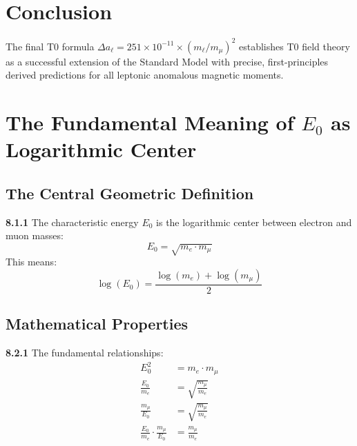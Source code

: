 \documentclass[12pt,a4paper]{article}
\newcommand{\Ezero}{E_0}
\begin{document}
	\section{Conclusion}
	
	The final T0 formula $\Delta a_\ell = 251 \times 10^{-11} \times (m_\ell/m_\mu)^2$ establishes T0 field theory as a successful extension of the Standard Model with precise, first-principles derived predictions for all leptonic anomalous magnetic moments.

\section{The Fundamental Meaning of $\Ezero$ as Logarithmic Center}

\subsection{The Central Geometric Definition}

\begin{tcolorbox}[colback=yellow!10!white,colframe=red!75!black,title=Fundamental Definition]
	\noindent \textbf{8.1.1} The characteristic energy $\Ezero$ is the logarithmic center between electron and muon masses:
	\begin{equation}
		\boxed{\Ezero = \sqrt{m_e \cdot m_\mu}}
		\label{eq:E0_fundamental}
	\end{equation}
	This means:
	\begin{equation}
		\log(\Ezero) = \frac{\log(m_e) + \log(m_\mu)}{2}
		\label{eq:E0_logarithmic}
	\end{equation}
\end{tcolorbox}

\subsection{Mathematical Properties}

\noindent \textbf{8.2.1} The fundamental relationships:
\begin{align}
	\Ezero^2 &= m_e \cdot m_\mu \label{eq:E0_squared} \\
	\frac{\Ezero}{m_e} &= \sqrt{\frac{m_\mu}{m_e}} \label{eq:E0_ratio1} \\
	\frac{m_\mu}{\Ezero} &= \sqrt{\frac{m_\mu}{m_e}} \label{eq:E0_ratio2} \\
	\frac{\Ezero}{m_e} \cdot \frac{m_\mu}{\Ezero} &= \frac{m_\mu}{m_e} \label{eq:E0_product}
\end{align}
\end{document}
